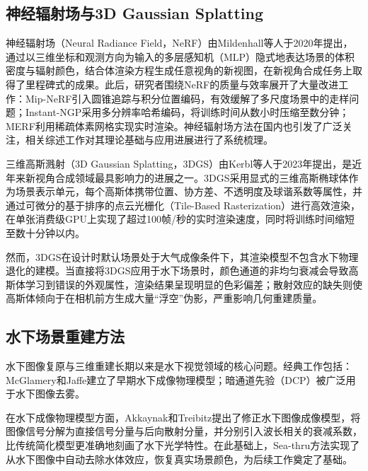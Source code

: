 \subsection{神经辐射场与3D Gaussian Splatting}

神经辐射场（Neural Radiance Field，NeRF）由Mildenhall等人于2020年提出，通过以三维坐标和观测方向为输入的多层感知机（MLP）隐式地表达场景的体积密度与辐射颜色，结合体渲染方程生成任意视角的新视图，在新视角合成任务上取得了里程碑式的成果。此后，研究者围绕NeRF的质量与效率展开了大量改进工作：Mip-NeRF引入圆锥追踪与积分位置编码，有效缓解了多尺度场景中的走样问题；Instant-NGP采用多分辨率哈希编码，将训练时间从数小时压缩至数分钟；MERF利用稀疏体素网格实现实时渲染。神经辐射场方法在国内也引发了广泛关注，相关综述工作对其理论基础与应用进展进行了系统梳理。

三维高斯溅射（3D Gaussian Splatting，3DGS）由Kerbl等人于2023年提出，是近年来新视角合成领域最具影响力的进展之一。3DGS采用显式的三维高斯椭球体作为场景表示单元，每个高斯体携带位置、协方差、不透明度及球谐系数等属性，并通过可微分的基于排序的点云光栅化（Tile-Based Rasterization）进行高效渲染，在单张消费级GPU上实现了超过100帧/秒的实时渲染速度，同时将训练时间缩短至数十分钟以内。

然而，3DGS在设计时默认场景处于大气成像条件下，其渲染模型不包含水下物理退化的建模。当直接将3DGS应用于水下场景时，颜色通道的非均匀衰减会导致高斯体学习到错误的外观属性，渲染结果呈现明显的色彩偏差；散射效应的缺失则使高斯体倾向于在相机前方生成大量“浮空”伪影，严重影响几何重建质量。

\subsection{水下场景重建方法}

水下图像复原与三维重建长期以来是水下视觉领域的核心问题。经典工作包括：McGlamery和Jaffe建立了早期水下成像物理模型；暗通道先验（DCP）被广泛用于水下图像去雾。

在水下成像物理模型方面，Akkaynak和Treibitz提出了修正水下图像成像模型，将图像信号分解为直接信号分量与后向散射分量，并分别引入波长相关的衰减系数，比传统简化模型更准确地刻画了水下光学特性。在此基础上，Sea-thru方法实现了从水下图像中自动去除水体效应，恢复真实场景颜色，为后续工作奠定了基础。

